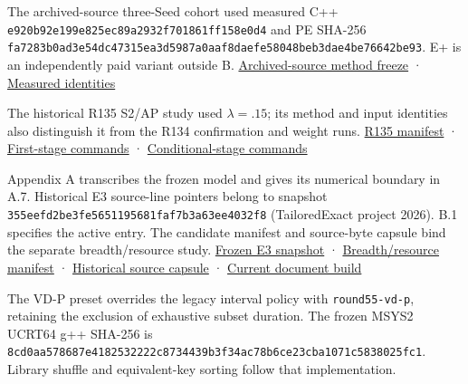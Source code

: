 \documentclass[
  american,
  11pt,
]{article}
\begin{document}
The archived-source three-Seed cohort used measured C++
\texttt{e920b92e\allowbreak{}199e825e\allowbreak{}c89a2932\allowbreak{}f701861f\allowbreak{}f158e0d4} and
PE SHA-256
\texttt{fa7283b0\allowbreak{}ad3e54dc\allowbreak{}47315ea3\allowbreak{}d5987a0a\allowbreak{}af8daefe\allowbreak{}58048beb\allowbreak{}3dae4be7\allowbreak{}6642be93}.
E+ is an independently paid variant outside B.
\href{https://github.com/yifanXovo/TailoredExact/blob/codex/round172-journal-manuscript/results/unified_exact_round164/method_freeze.json}{Archived-source
method freeze} ·
\href{https://github.com/yifanXovo/TailoredExact/blob/codex/round172-journal-manuscript/results/unified_exact_round164/science_identity.json}{Measured
identities}

The historical R135 S2/AP study used \(\lambda=.15\); its method and
input identities also distinguish it from the R134 confirmation and
weight runs.
\href{https://github.com/yifanXovo/TailoredExact/blob/25800aa6b51bf7607b51e5df14a10a5ca4571889/results/unified_exact_round135/candidate_manifest.json}{R135
manifest} ·
\href{https://github.com/yifanXovo/TailoredExact/blob/25800aa6b51bf7607b51e5df14a10a5ca4571889/results/unified_exact_round135/C_matrix_frozen.json}{First-stage
commands} ·
\href{https://github.com/yifanXovo/TailoredExact/blob/25800aa6b51bf7607b51e5df14a10a5ca4571889/results/unified_exact_round135/D_matrix_frozen.json}{Conditional-stage
commands}

Appendix A transcribes the frozen model and gives its numerical boundary
in A.7. Historical E3 source-line pointers belong to snapshot
\texttt{355eefd2\allowbreak{}be3fe565\allowbreak{}1195681f\allowbreak{}af7b3a63\allowbreak{}ee4032f8}
(TailoredExact project 2026). B.1 specifies the active entry. The
candidate manifest and source-byte capsule bind the separate
breadth/resource study.
\href{https://github.com/yifanXovo/TailoredExact/tree/355eefd2be3fe5651195681faf7b3a63ee4032f8}{Frozen
E3 snapshot} ·
\href{https://github.com/yifanXovo/TailoredExact/blob/codex/round172-journal-manuscript/results/unified_exact_round137/candidate_manifest.json}{Breadth/resource
manifest} ·
\href{https://github.com/yifanXovo/TailoredExact/blob/codex/round172-journal-manuscript/results/unified_exact_round137/source_publication.json}{Historical
source capsule} ·
\href{https://github.com/yifanXovo/TailoredExact/blob/codex/round172-journal-manuscript/results/unified_exact_round172/document_build.json}{Current
document build}

The VD-P preset overrides the legacy interval policy with
\texttt{round55-\allowbreak{}vd-\allowbreak{}p}, retaining the exclusion of
exhaustive subset duration. The frozen MSYS2 UCRT64 g++ SHA-256 is
\texttt{8cd0aa57\allowbreak{}8687e418\allowbreak{}2532222c\allowbreak{}8734439b\allowbreak{}3f34ac78\allowbreak{}b6ce23cb\allowbreak{}a1071c58\allowbreak{}38025fc1}.
Library shuffle and equivalent-key sorting follow that implementation.
\end{document}
